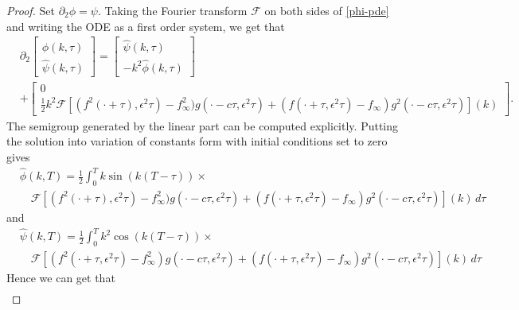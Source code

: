 \begin{proof}
	Set \(\partial_2 \phi = \psi\). Taking the Fourier transform \(\mathcal F\) on both sides of \cref{phi-pde} and writing the ODE as a first order system, we get that 
	\begin{equation}
	\begin{aligned}
		&\partial_2 \begin{bmatrix} \hat \phi(k,\tau) \\ \hat \psi(k,\tau) \end{bmatrix} = \begin{bmatrix}\hat \psi(k,\tau) \\ -k^2 \hat\phi(k,\tau) \end{bmatrix} \\ &+ \begin{bmatrix}
			0 \\   \frac 1 2 k^2 \mathcal F[ (f^2(\cdot+\tau),\epsilon^2\tau)-f_\infty^2)g(\cdot-c\tau,\epsilon^2\tau) +(f(\cdot+\tau,\epsilon^2\tau)-f_\infty)g^2(\cdot-c\tau,\epsilon^2\tau)](k)
		\end{bmatrix}.
	\end{aligned}
	\end{equation}
	The semigroup generated by the linear part can be computed explicitly. Putting the solution into variation of constants form with initial conditions set to zero gives
	\begin{equation}
	\begin{aligned}
		&\hat  \phi(k,T) = \frac 1 2 \int_0^Tk\sin(k(T-\tau)) \times\\
		&\quad\mathcal F[ (f^2(\cdot+\tau),\epsilon^2\tau)-f_\infty^2)g(\cdot-c\tau,\epsilon^2\tau) +(f(\cdot+\tau,\epsilon^2\tau)-f_\infty)g^2(\cdot-c\tau,\epsilon^2\tau)](k)\, d\tau
	\end{aligned}
	\end{equation}
	and 
	\begin{equation}\label{psi-fourier-transform}
	\begin{aligned}
		&\hat  \psi(k,T) = \frac 1 2 \int_0^Tk^2\cos(k(T-\tau)) \times\\
		&\quad\mathcal F[ (f^2(\cdot+\tau,\epsilon^2\tau)-f_\infty^2)g(\cdot-c\tau,\epsilon^2\tau) +(f(\cdot+\tau,\epsilon^2\tau)-f_\infty)g^2(\cdot-c\tau,\epsilon^2\tau)](k)\, d\tau
	\end{aligned}
	\end{equation}
	Hence we can get that 
	\begin{equation}\label{phi-sobolev-bound}
	\begin{aligned}

\end{aligned}
\end{equation}
\end{proof}
